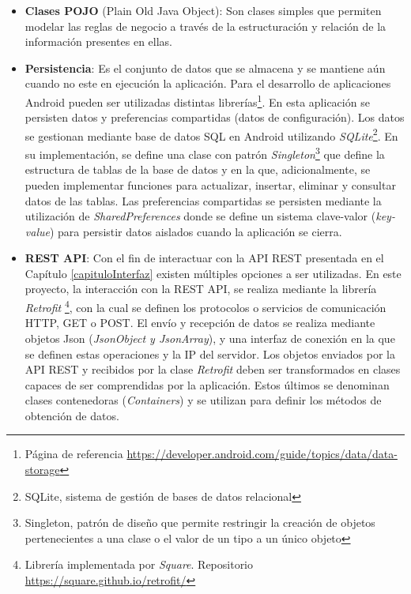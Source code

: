      \begin{itemize}
         \item \textbf{Clases POJO} (Plain Old Java Object): Son clases simples que permiten modelar las reglas de negocio a través de la estructuración y relación de la información presentes en ellas.
         
         
         \item \textbf{Persistencia}: Es el conjunto de datos que se almacena y se mantiene aún cuando no este en ejecución la aplicación. Para el desarrollo de aplicaciones Android pueden ser utilizadas distintas librerías\footnote{Página de referencia \url{https://developer.android.com/guide/topics/data/data-storage}}. En esta aplicación se persisten datos y preferencias compartidas (datos de configuración). Los datos se gestionan mediante base de datos SQL en Android utilizando \textit{SQLite}\footnote{SQLite, sistema de gestión de bases de datos relacional}. En su implementación, se define una clase con patrón \textit{Singleton}\footnote{Singleton, patrón de diseño que permite restringir la creación de objetos pertenecientes a una clase o el valor de un tipo a un único objeto} que define la estructura de tablas de la base de datos y en la que, adicionalmente, se pueden implementar funciones para actualizar, insertar, eliminar y consultar datos de las tablas. Las preferencias compartidas se persisten mediante la utilización de \textit{SharedPreferences} donde se define un sistema clave-valor (\textit{key-value}) para persistir datos aislados cuando la aplicación se cierra.
         
         \item \textbf{REST API}: Con el fin de interactuar con la API REST presentada en el Capítulo \ref{capituloInterfaz} existen múltiples opciones a ser utilizadas. En este proyecto, la interacción con la REST API, se realiza mediante la librería \textit{Retrofit} \footnote{Librería implementada por \textit{Square}. Repositorio \url{https://square.github.io/retrofit/}}, con la cual se definen los protocolos o servicios de comunicación HTTP, GET o POST. El envío y recepción de datos se realiza mediante objetos Json (\textit{JsonObject y JsonArray}), y una interfaz de conexión en la que se definen estas operaciones y la IP del servidor. Los objetos enviados por la API REST y recibidos por la clase \textit{Retrofit} deben ser transformados en clases capaces de ser comprendidas por la aplicación. Estos últimos se denominan clases contenedoras (\textit{Containers}) y se utilizan para  definir los métodos de obtención de datos.
        

\end{itemize}
